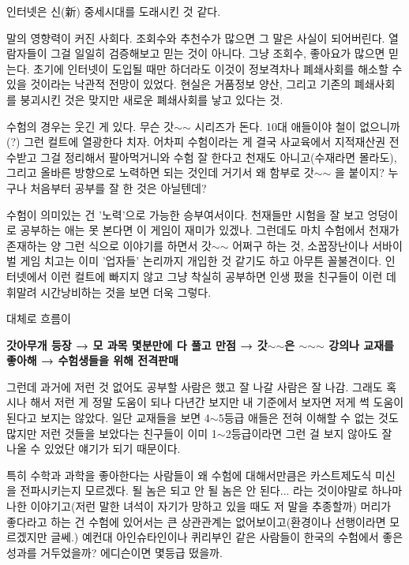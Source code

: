 \vspace{5mm}

인터넷은 신(新) 중세시대를 도래시킨 것 같다.
\vspace{5mm}

말의 영향력이 커진 사회다.
조회수와 추천수가 많으면 그 말은 사실이 되어버린다.
열람자들이 그걸 일일히 검증해보고 믿는 것이 아니다. 그냥 조회수, 좋아요가 많으면 믿는다.
초기에 인터넷이 도입될 때만 하더라도 이것이 정보격차나 폐쇄사회를 해소할 수 있을 것이라는 낙관적 전망이 있었다.
현실은 거품정보 양산, 그리고 기존의 폐쇄사회를 붕괴시킨 것은 맞지만 새로운 폐쇄사회를 낳고 있다는 것.
\vspace{5mm}

수험의 경우는 웃긴 게 있다.
무슨 갓$\sim$$\sim$ 시리즈가 돈다. 10대 애들이야 철이 없으니까(?) 그런 컬트에 열광한다 치자.
어차피 수험이라는 게 결국 사교육에서 지적재산권 전수받고 그걸 정리해서 팔아먹거니와
수험 잘 한다고 천재도 아니고(수재라면 몰라도), 그리고 올바른 방향으로 노력하면 되는 것인데 거기서 왜 함부로 갓$\sim$$\sim$ 을 붙이지?
누구나 처음부터 공부를 잘 한 것은 아닐텐데?
\vspace{5mm}

수험이 의미있는 건 '노력'으로 가능한 승부여서이다.
천재들만 시험을 잘 보고 엉덩이로 공부하는 애는 못 본다면 이 게임이 재미가 있겠나.
그런데도 마치 수험에서 천재가 존재하는 양 그런 식으로 이야기를 하면서 갓$\sim$$\sim$ 어쩌구 하는 것,
소꿉장난이나 서바이벌 게임 치고는 이미 '업자들' 논리까지 개입한 것 같기도 하고 아무튼 꼴불견이다.
인터넷에서 이런 컬트에 빠지지 않고 그냥 착실히 공부하면 인생 폈을 친구들이 이런 데 휘말려 시간낭비하는 것을 보면 더욱 그렇다.
\vspace{5mm}

대체로 흐름이
\vspace{5mm}

\textbf{갓아무개 등장 → 모 과목 몇분만에 다 풀고 만점 → 갓$\sim$$\sim$은 $\sim$$\sim$$\sim$ 강의나 교재를 좋아해 → 수험생들을 위해 전격판매}
\vspace{5mm}

그런데 과거에 저런 것 없어도 공부할 사람은 했고 잘 나갈 사람은 잘 나감.
그래도 혹시나 해서 저런 게 정말 도움이 되나 다년간 보지만 내 기준에서 보자면 저게 썩 도움이 된다고 보지는 않았다.
일단 교재들을 보면 4$\sim$5등급 애들은 전혀 이해할 수 없는 것도 많지만
저런 것들을 보았다는 친구들이 이미 1$\sim$2등급이라면 그런 걸 보지 않아도 잘 나올 수 있었단 얘기가 되기 때문이다.
\vspace{5mm}

특히 수학과 과학을 좋아한다는 사람들이 왜 수험에 대해서만큼은 카스트제도식 미신을 전파시키는지 모르겠다.
될 놈은 되고 안 될 놈은 안 된다... 라는 것이야말로 하나마나한 이야기고(저런 말한 녀석이 자기가 망하고 있을 때도 저 말을 추종할까)
머리가 좋다라고 하는 건 수험에 있어서는 큰 상관관계는 없어보이고(환경이나 선행이라면 모르겠지만 글쎄.)
예컨대 아인슈타인이나 퀴리부인 같은 사람들이 한국의 수험에서 좋은 성과를 거두었을까? 에디슨이면 몇등급 떴을까.
\vspace{5mm}

